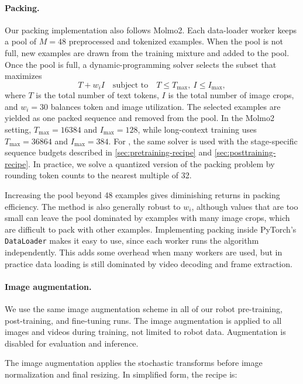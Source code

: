 \paragraph{Packing.}
Our packing implementation also follows Molmo2. Each data-loader worker keeps
a pool of \(M=48\) preprocessed and tokenized examples. When the pool is not
full, new examples are drawn from the training mixture and added to the pool.
Once the pool is full, a dynamic-programming solver selects the subset that
maximizes
\begin{equation}
    T + w_i I
    \quad\text{subject to}\quad
    T \leq T_{\max},\ I \leq I_{\max},
\end{equation}
where \(T\) is the total number of text tokens, \(I\) is the total number of
image crops, and \(w_i=30\) balances token and image utilization. The selected
examples are yielded as one packed sequence and removed from the pool. In the
Molmo2 setting, \(T_{\max}=16384\) and \(I_{\max}=128\), while long-context
training uses \(T_{\max}=36864\) and \(I_{\max}=384\). For \molmoactt, the
same solver is used with the stage-specific sequence budgets described in
\autoref{sec:pretraining-recipe} and \autoref{sec:posttraining-recipe}. In
practice, we solve a quantized version of the packing problem by rounding token
counts to the nearest multiple of 32.

Increasing the pool beyond 48 examples gives diminishing returns in packing
efficiency. The method is also generally robust to \(w_i\), although values
that are too small can leave the pool dominated by examples with many image
crops, which are difficult to pack with other examples. Implementing packing
inside PyTorch's \texttt{DataLoader} makes it easy to use, since each worker
runs the algorithm independently. This adds some overhead when many workers are
used, but in practice data loading is still dominated by video decoding and
frame extraction.

\paragraph{Image augmentation.}
We use the same image augmentation scheme in all of our robot pre-training, post-training, and fine-tuning runs. The image augmentation is applied to all images and videos during training, not limited to robot data. Augmentation is
disabled for evaluation and inference.

The image augmentation applies the stochastic transforms before image
normalization and final resizing. In simplified form, the recipe is:

